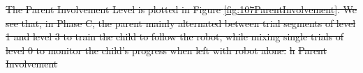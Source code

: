 \documentclass{ut-thesis}
\providecommand{\DIFaddtex}[1]{{\protect\color{blue}\uwave{#1}}} %
\providecommand{\DIFdeltex}[1]{{\protect\color{red}\sout{#1}}}                      %
\providecommand{\DIFaddbegin}{} %
\providecommand{\DIFaddend}{} %
\providecommand{\DIFdelend}{} %
\providecommand{\DIFdelFL}[1]{\DIFdel{#1}} %
\providecommand{\DIFadd}[1]{\texorpdfstring{\DIFaddtex{#1}}{#1}} %
\providecommand{\DIFdel}[1]{\texorpdfstring{\DIFdeltex{#1}}{}} %
\begin{document}
\DIFdel{The Parent Involvement Level is plotted in Figure \ref{fig:107ParentInvolvement}.
We see that, in Phase C, the parent mainly alternated between trial segments of level 1 and level 3 to train the child to follow the robot, while mixing single trials of level 0 to monitor the child's progress when left with robot alone.  }%
\DIFdelFL{h}%
{%
\DIFdelFL{Parent Involvement}}
\DIFdelend \DIFaddbegin \DIFadd{step.
}\DIFaddend 
\end{document}
